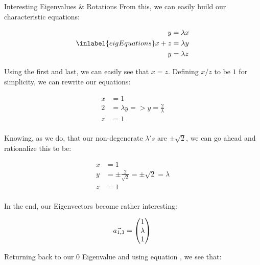 \begin{answer}
\begin{answerpart}{Interesting Eigenvalues \& Rotations}
    From this, we can easily build our characteristic equations:

    \begin{equation}
      \inlabel{eigEquations}
      \begin{split}
        y &= \lambda x\\
        x + z &= \lambda y\\
        y &= \lambda z\\
      \end{split}
    \end{equation}

    Using the first and last, we can easily see that $x = z$.
    Defining $x/z$ to be $1$ for simplicity, we can rewrite our
    equations:

    \begin{equation}
      \begin{split}
        x &= 1\\
        2 &= \lambda y => y = \frac{2}{\lambda}\\
        z &= 1\\
      \end{split}
    \end{equation}

    Knowing, as we do, that our non-degenerate $\lambda's$ are $\pm
    \sqrt{2}$, we can go ahead and rationalize this to be:

    \begin{equation}
      \begin{split}
        x &= 1\\
        y &= \pm \frac{2}{\sqrt{2}} = \pm\sqrt{2} = \lambda\\
        z &= 1\\
      \end{split}
    \end{equation}

    In the end, our Eigenvectors become rather interesting:

    \begin{equation}
      \vec{a_{1,3}} = 
      \begin{pmatrix}
        1\\
        \lambda\\
        1\\
      \end{pmatrix}\\
    \end{equation}

    Returning back to our $0$ Eigenvalue and using equation
    , we see that:


\end{answerpart}
\end{answer}
